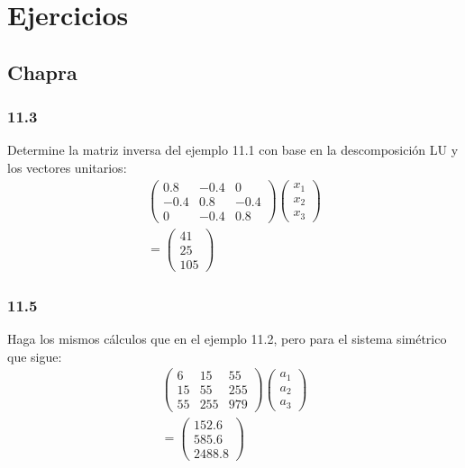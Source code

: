 \documentclass[12pt,oneside,FLEQN]{report}
\begin{document}
{	\section{Ejercicios}
		\subsection{Chapra}
			\subsubsection{11.3}
			Determine la matriz inversa del ejemplo 11.1 con base en la descomposición LU y los vectores unitarios:
			\begin{align}
				\begin{pmatrix}
					0.8&-0.4&0\\
					-0.4&0.8&-0.4\\
					0&-0.4&0.8
				\end{pmatrix}
				\begin{pmatrix}
					x_{1}\\
					x_{2}\\
					x_{3}
				\end{pmatrix}\\
				=\begin{pmatrix}
					41\\
					25\\
					105
				\end{pmatrix}
			\end{align}
			\subsubsection{11.5}
			Haga los mismos cálculos que en el ejemplo 11.2, pero para el sistema simétrico que sigue:
			\begin{align}
                                \begin{pmatrix}
					6&15&55\\
                                        15&55&255\\
					55&255&979
                                \end{pmatrix}
                                \begin{pmatrix}
                                        a_{1}\\
                                        a_{2}\\
                                        a_{3}
                                \end{pmatrix}\\
                                =\begin{pmatrix}
                                        152.6\\
                                        585.6\\
                                        2488.8
                                \end{pmatrix}
                        \end{align}
}
\end{document}
